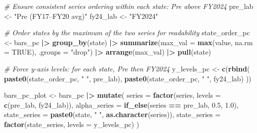 \documentclass[
  11pt,
]{article}
\newenvironment{Shaded}{\begin{snugshade}}{\end{snugshade}}
\newcommand{\AttributeTok}[1]{\textcolor[rgb]{0.13,0.29,0.53}{#1}}
\newcommand{\CommentTok}[1]{\textcolor[rgb]{0.56,0.35,0.01}{\textit{#1}}}
\newcommand{\ConstantTok}[1]{\textcolor[rgb]{0.56,0.35,0.01}{#1}}
\newcommand{\FloatTok}[1]{\textcolor[rgb]{0.00,0.00,0.81}{#1}}
\newcommand{\FunctionTok}[1]{\textcolor[rgb]{0.13,0.29,0.53}{\textbf{#1}}}
\newcommand{\NormalTok}[1]{#1}
\newcommand{\OtherTok}[1]{\textcolor[rgb]{0.56,0.35,0.01}{#1}}
\newcommand{\SpecialCharTok}[1]{\textcolor[rgb]{0.81,0.36,0.00}{\textbf{#1}}}
\newcommand{\StringTok}[1]{\textcolor[rgb]{0.31,0.60,0.02}{#1}}
\begin{document}
\begin{Shaded}
\begin{Highlighting}[]
\CommentTok{\# Ensure consistent series ordering within each state: Pre above FY2024}
\NormalTok{pre\_lab }\OtherTok{\textless{}{-}} \StringTok{"Pre (FY17–FY20 avg)"}
\NormalTok{fy24\_lab }\OtherTok{\textless{}{-}} \StringTok{"FY2024"}

\CommentTok{\# Order states by the maximum of the two series for readability}
\NormalTok{state\_order\_pc }\OtherTok{\textless{}{-}}\NormalTok{ bars\_pc }\SpecialCharTok{|\textgreater{}}
  \FunctionTok{group\_by}\NormalTok{(state) }\SpecialCharTok{|\textgreater{}}
  \FunctionTok{summarize}\NormalTok{(}\AttributeTok{max\_val =} \FunctionTok{max}\NormalTok{(value, }\AttributeTok{na.rm =} \ConstantTok{TRUE}\NormalTok{), }\AttributeTok{.groups =} \StringTok{"drop"}\NormalTok{) }\SpecialCharTok{|\textgreater{}}
  \FunctionTok{arrange}\NormalTok{(max\_val) }\SpecialCharTok{|\textgreater{}}
  \FunctionTok{pull}\NormalTok{(state)}

\CommentTok{\# Force y{-}axis levels: for each state, Pre then FY2024}
\NormalTok{y\_levels\_pc }\OtherTok{\textless{}{-}} \FunctionTok{c}\NormalTok{(}\FunctionTok{rbind}\NormalTok{(}
  \FunctionTok{paste0}\NormalTok{(state\_order\_pc, }\StringTok{"  "}\NormalTok{, pre\_lab),}
  \FunctionTok{paste0}\NormalTok{(state\_order\_pc, }\StringTok{"  "}\NormalTok{, fy24\_lab)}
\NormalTok{))}

\NormalTok{bars\_pc\_plot }\OtherTok{\textless{}{-}}\NormalTok{ bars\_pc }\SpecialCharTok{|\textgreater{}}
  \FunctionTok{mutate}\NormalTok{(}
    \AttributeTok{series =} \FunctionTok{factor}\NormalTok{(series, }\AttributeTok{levels =} \FunctionTok{c}\NormalTok{(pre\_lab, fy24\_lab)),}
    \AttributeTok{alpha\_series =} \FunctionTok{if\_else}\NormalTok{(series }\SpecialCharTok{==}\NormalTok{ pre\_lab, }\FloatTok{0.5}\NormalTok{, }\FloatTok{1.0}\NormalTok{),}
    \AttributeTok{state\_series =} \FunctionTok{paste0}\NormalTok{(state, }\StringTok{"  "}\NormalTok{, }\FunctionTok{as.character}\NormalTok{(series)),}
    \AttributeTok{state\_series =} \FunctionTok{factor}\NormalTok{(state\_series, }\AttributeTok{levels =}\NormalTok{ y\_levels\_pc)}
\NormalTok{  )}


\end{Highlighting}
\end{Shaded}
\end{document}
